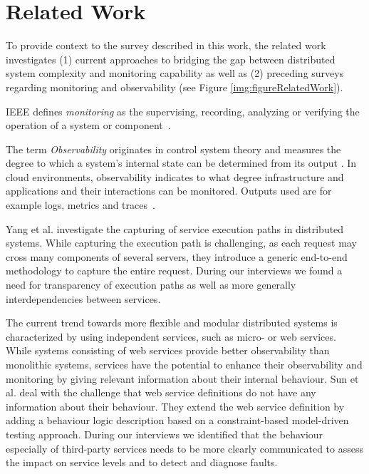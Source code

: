 \documentclass[runningheads]{llncs}
\begin{document}
\section{Related Work}
\label{Related Work}

To provide context to the survey described in this work, the related work investigates (1) current approaches to bridging the gap between distributed system complexity and monitoring capability as well as (2) preceding surveys regarding monitoring and observability (see Figure \ref{img:figureRelatedWork}).

IEEE defines \emph{monitoring} as the supervising, recording, analyzing or verifying the operation of a system or component~\cite{IEEE1990glossary}. 

The term \emph{Observability} originates in control system theory and measures the degree to which a system's internal state can be determined from its output \cite{gopal1993observability}. In cloud environments, observability indicates to what degree infrastructure and applications and their interactions can be monitored. Outputs used are for example logs, metrics and traces~\cite{picoreti2018observability}.

Yang et al. \cite{yYang2018TransparentlyCapturingExecutionPath} investigate the capturing of service execution paths in distributed systems. While capturing the execution path is challenging, as each request may cross many components of several servers, they introduce a generic end-to-end methodology to capture the entire request. During our interviews we found a need for transparency of execution paths as well as more generally interdependencies between services.

The current trend towards more flexible and modular distributed systems is characterized by using independent services, such as micro- or web services. While systems consisting of web services provide better observability than monolithic systems, services have the potential to enhance their observability and monitoring by giving relevant information about their internal behaviour. Sun et al. \cite{cSun2018ConstraintBasedModelDriven} deal with the challenge that web service definitions do not have any information about their behaviour. They extend the web service definition by adding a behaviour logic description based on a constraint-based model-driven testing approach. During our interviews we identified that the behaviour especially of third-party services needs to be more clearly communicated to assess the impact on service levels and to detect and diagnose faults.
\end{document}
